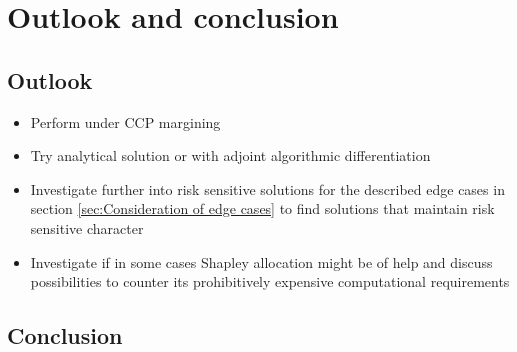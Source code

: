 \documentclass[../Thesis_AHoecherl.tex]{subfiles}
\begin{document}
    \chapter{Outlook and conclusion}\label{Outlook and Conclusion}
    \section{Outlook\label{sec:Outlook}}
    \begin{itemize}
        \item Perform under CCP margining
        \item Try analytical solution or with adjoint algorithmic differentiation
        \item Investigate further into risk sensitive solutions for the described edge cases in section \ref{sec:Consideration of edge cases} to find solutions that maintain risk sensitive character
        \item Investigate if in some cases Shapley allocation might be of help and discuss possibilities to counter its prohibitively expensive computational requirements
    \end{itemize}
    \section{Conclusion}\label{Conclusion}
\end{document}
